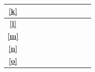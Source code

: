 \documentclass{article}
\begin{document}
\begin{table}[H]
\begin{tabular}{|c|c|c|c|c|c|c|c|c|c|c|}
	\textbf{\ref{k}}                     &                                                                     &                                                                     &                                                                    &                                                                    &                                                                     & \cellcolor{bleu_cite}                                              &                                                                    &                                                                      \\ \hline
	\textbf{\ref{l}}                     &                                                                     &                                                                     &                                                                    &                                                                    &                                                                     & \cellcolor{bleu_cite}                                              & \cellcolor{bleu_cite}                                              &                                                                      \\ \hline
	\textbf{\ref{m}}                     &                                                                     &                                                                     &                                                                    &                                                                    &                                                                     &                                                                    & \cellcolor{bleu_cite}                                              &                                                                      \\ \hline
	\textbf{\ref{n}}                     &                                                                     &                                                                     &                                                                    &                                                                    &                                                                     &                                                                    &                                                                    & \cellcolor{bleu_cite}                                                \\ \hline
	\textbf{\ref{o}}                     &                                                                     & \cellcolor{bleu_cite}                                               &                                                                    & \cellcolor{bleu_cite}                                              &                                                                     &                                                                    &                                                                    & \cellcolor{bleu_cite}                                                \\ \hline

\end{tabular}
\end{table}
\end{document}
